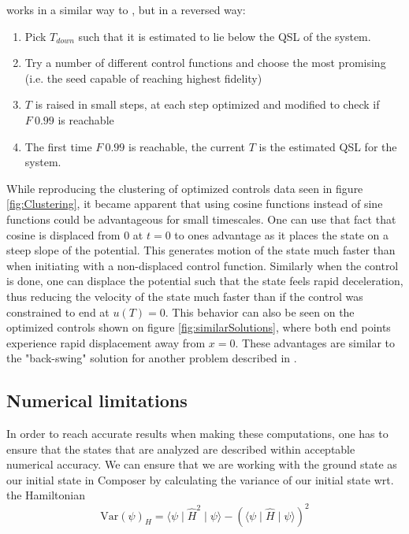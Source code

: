 \documentclass[aps,pra,reprint,superscriptaddress]{revtex4-1}
\begin{document}
 works in a similar way to , but in a reversed way: 
\begin{enumerate}
	\item Pick $T_{down}$ such that it is estimated to lie below the QSL of the system.
	\item Try a number of different control functions and choose the most promising (i.e. the seed capable of reaching highest fidelity)
	\item $T$ is raised in small steps, at each step optimized and modified to check if $F~0.99$ is reachable
	\item The first time $F~0.99$ is reachable, the current $T$ is the estimated QSL for the system.
\end{enumerate}

While reproducing the clustering of optimized controls data seen in figure \ref{fig:Clustering}, it became apparent that using cosine functions instead of sine functions could be advantageous for small timescales. One can use that fact that cosine is displaced from 0 at $t=0$ to ones advantage as it places the state on a steep slope of the potential. This generates motion of the state much faster than when initiating with a non-displaced control function. Similarly when the control is done, one can displace the potential such that the state feels rapid deceleration, thus reducing the velocity of the state much faster than if the control was constrained to end at $u(T)=0$. This behavior can also be seen on the optimized controls shown on figure \ref{fig:similarSolutions}, where both end points experience rapid displacement away from $x=0$. These advantages are similar to the "back-swing" solution for another problem described in \cite{QM2Paper}.

\subsection{\label{subsec:numericalLimitations} Numerical limitations}
In order to reach accurate results when making these computations, one has to ensure that the states that are analyzed are described within acceptable numerical accuracy. We can ensure that we are working with the ground state as our initial state in Composer by calculating the variance of our initial state wrt. the Hamiltonian
\begin{equation}
	\text{Var}(\psi)_H = \langle \psi \mid \hat{H}^2 \mid \psi \rangle - (\langle \psi \mid \hat{H} \mid \psi \rangle)^2
\end{equation}
\end{document}
